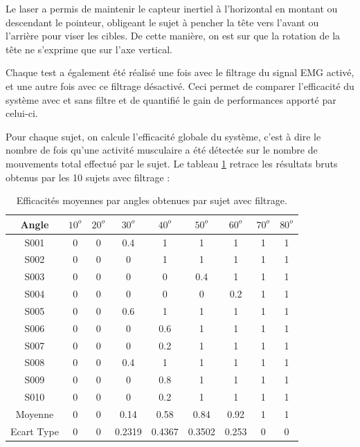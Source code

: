 \documentclass[letterpaper, twoside, 12pt, memoire, creativecommons, hyperref]{thETS}
\begin{document}
Le laser a permis de maintenir le capteur inertiel à l'horizontal en montant ou descendant le pointeur, obligeant le sujet à pencher la tête vers l'avant ou l'arrière pour viser les cibles. De cette manière, on est sur que la rotation de la tête ne s'exprime que sur l'axe vertical.

Chaque test a également été réalisé une fois avec le filtrage du signal EMG activé, et une autre fois avec ce filtrage désactivé. Ceci permet de comparer l'efficacité du système avec et sans filtre et de quantifié le gain de performances apporté par celui-ci.

Pour chaque sujet, on calcule l'efficacité globale du système, c'est à dire le nombre de fois qu'une activité musculaire a été détectée sur le nombre de mouvements total effectué par le sujet. Le tableau \ref{tab:effangles} retrace les résultats bruts obtenus par les 10 sujets avec filtrage : 

\begin{table}[ht]
	\caption{Efficacités moyennes par angles obtenues par sujet avec filtrage. }
		\begin{tabular}{|c|c|c|c|c|c|c|c|c|}
		\hline
			Angle & $10^{o}$ & $20^{o}$ & $30^{o}$ & $40^{o}$ & $50^{o}$ & $60^{o}$ & $70^{o}$ & $80^{o}$\\
	    \hline
	    		S001 & 0 & 0 & 0.4 & 1 & 1 & 1 & 1 & 1\\
	    \hline
			S002 & 0 & 0 & 0 & 1 & 1 & 1 & 1 & 1\\
	    \hline
	    		S003 & 0 & 0 & 0 & 0 & 0.4 & 1 & 1 & 1\\
	    \hline
	    		S004 & 0 & 0 & 0 & 0 & 0 & 0.2 & 1 & 1\\
	    \hline
	    		S005 & 0 & 0 & 0.6 & 1 & 1 & 1 & 1 & 1\\
	    \hline
	    		S006 & 0 & 0 & 0 & 0.6 & 1 & 1 & 1 & 1\\
	    \hline
	    		S007 & 0 & 0 & 0 & 0.2 & 1 & 1 & 1 & 1\\
	    \hline
	    		S008 & 0 & 0 & 0.4 & 1 & 1 & 1 & 1 & 1\\
	    \hline
	    		S009 & 0 & 0 & 0 & 0.8 & 1 & 1 & 1 & 1\\
	    \hline
	    		S010 & 0 & 0 & 0 & 0.2 & 1 & 1 & 1 & 1\\
	    \hline
	    		Moyenne & 0 & 0 & 0.14 & 0.58 & 0.84 & 0.92 & 1 & 1\\
	    \hline
	    		Ecart Type & 0 & 0 & 0.2319 & 0.4367 & 0.3502 & 0.253 & 0 & 0\\
	    \hline
		\end{tabular}
	\label{tab:effangles}
\end{table}
\end{document}
